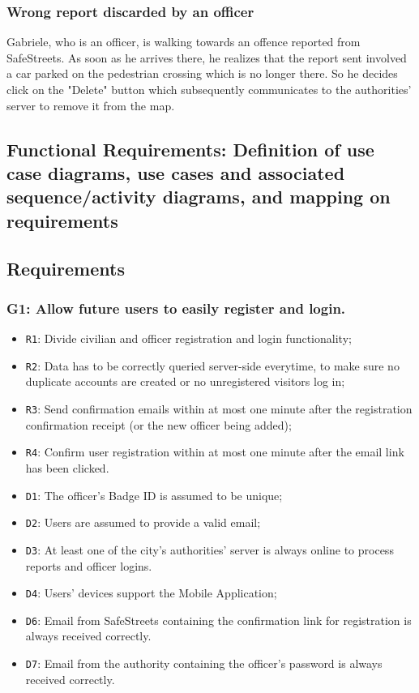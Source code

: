 \documentclass[12pt,a4paper]{article}
\begin{document}
\subsubsection{Wrong report discarded by an officer}
Gabriele, who is an officer, is walking towards an offence reported from SafeStreets. As soon as he arrives there, he realizes that the report sent involved a car parked on the pedestrian crossing which is no longer there. So he decides click on the "Delete" button which subsequently communicates to the authorities' server to remove it from the map.

\subsection{Functional	 Requirements:	 Definition	 of	 use	 case	 diagrams,	 use	 cases	 and	 associated	
sequence/activity	diagrams,	and	mapping	on	requirements} 
\subsection{Requirements}
\subsubsection{G1: Allow future users to easily register and login.}
	
	\begin{itemize}
			\item \texttt{R1}: Divide civilian and officer registration and login functionality;
			\item \texttt{R2}: Data has to be correctly queried server-side everytime, to make sure no duplicate accounts are created or no unregistered visitors log in;
			\item \texttt{R3}: Send confirmation emails within at most one minute after the registration confirmation receipt (or the new officer being added); 
			\item \texttt{R4}: Confirm user registration within at most one minute after the email link has been clicked.
	\end{itemize}
	
	\begin{itemize}
			\item \texttt{D1}: The officer's Badge ID is assumed to be unique;
			\item \texttt{D2}: Users are assumed to provide a valid email;
			\item \texttt{D3}: At least one of the city's authorities' server is always online to process reports and officer logins.
			\item \texttt{D4}: Users' devices support the Mobile Application;
			\item \texttt{D6}: Email from SafeStreets containing the confirmation link for registration is always received correctly.
			\item \texttt{D7}: Email from the authority containing the officer's password is always received correctly.
	\end{itemize}
\end{document}
